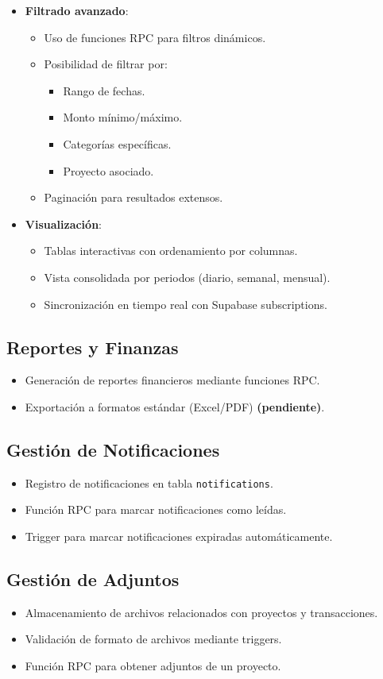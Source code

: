 \begin{itemize}
    \item \textbf{Filtrado avanzado}:
    \begin{itemize}
        \item Uso de funciones RPC para filtros dinámicos.
        \item Posibilidad de filtrar por:
        \begin{itemize}
            \item Rango de fechas.
            \item Monto mínimo/máximo.
            \item Categorías específicas.
            \item Proyecto asociado.
        \end{itemize}
        \item Paginación para resultados extensos.
    \end{itemize}
    
    \item \textbf{Visualización}:
    \begin{itemize}
        \item Tablas interactivas con ordenamiento por columnas.
        \item Vista consolidada por periodos (diario, semanal, mensual).
        \item Sincronización en tiempo real con Supabase subscriptions.
    \end{itemize}
\end{itemize}

\subsection*{Reportes y Finanzas}
\begin{itemize}
    \item Generación de reportes financieros mediante funciones RPC.
    \item Exportación a formatos estándar (Excel/PDF) \textbf{(pendiente)}.
\end{itemize}

\subsection*{Gestión de Notificaciones}
\begin{itemize}
    \item Registro de notificaciones en tabla \texttt{notifications}.
    \item Función RPC para marcar notificaciones como leídas.
    \item Trigger para marcar notificaciones expiradas automáticamente.
\end{itemize}

\subsection*{Gestión de Adjuntos}
\begin{itemize}
    \item Almacenamiento de archivos relacionados con proyectos y transacciones.
    \item Validación de formato de archivos mediante triggers.
    \item Función RPC para obtener adjuntos de un proyecto.
\end{itemize}